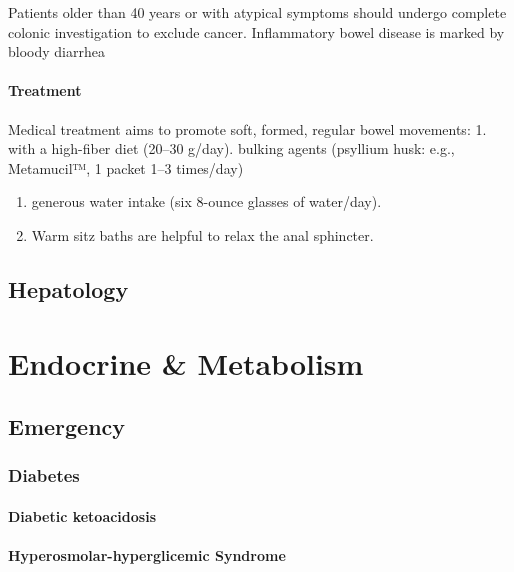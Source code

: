 \documentclass[
  letterpaper,
  DIV=11,
  numbers=noendperiod]{scrreprt}
\begin{document}
Patients older than 40 years or with atypical symptoms should undergo
complete colonic investigation to exclude cancer. Inﬂammatory bowel
disease is marked by bloody diarrhea

\subsubsection{Treatment}\label{treatment-1}

Medical treatment aims to promote soft, formed, regular bowel movements:
1. with a high-ﬁber diet (20--30 g/day). bulking agents (psyllium husk:
e.g., Metamucil™, 1 packet 1--3 times/day)

\begin{enumerate}
\def\labelenumi{\arabic{enumi}.}
\setcounter{enumi}{1}
\item
  generous water intake (six 8-ounce glasses of water/day).
\item
  Warm sitz baths are helpful to relax the anal sphincter.
\end{enumerate}

\section{Hepatology}\label{hepatology}

\chapter{Endocrine \& Metabolism}\label{endocrine-metabolism}

\section{Emergency}\label{emergency}

\subsection{Diabetes}\label{diabetes}

\subsubsection{Diabetic ketoacidosis}\label{diabetic-ketoacidosis}

\subsubsection{Hyperosmolar-hyperglicemic
Syndrome}\label{hyperosmolar-hyperglicemic-syndrome}
\end{document}
